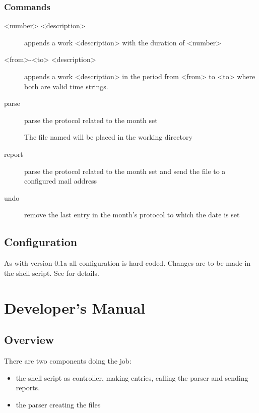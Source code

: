 \documentclass[letterpaper,10pt,english]{sphinxmanual}
\begin{document}
\subsubsection{Commands}
\label{\detokenize{usermanual:commands}}\begin{description}
\item[{\textless{}number\textgreater{} \textless{}description\textgreater{}}] \leavevmode
appends a work \textless{}description\textgreater{} with the duration of \textless{}number\textgreater{}

\item[{\textless{}from\textgreater{}-\textless{}to\textgreater{} \textless{}description\textgreater{}}] \leavevmode
appends a work \textless{}description\textgreater{} in the period from \textless{}from\textgreater{} to \textless{}to\textgreater{} where both are  valid time strings.

\item[{parse}] \leavevmode
parse the protocol related to the month set

The file named  will be placed in the working directory

\item[{report}] \leavevmode
parse the protocol related to the month set and send the  file to a configured mail address

\item[{undo}] \leavevmode
remove the last entry in the month’s protocol to which the date is set

\end{description}


\subsection{Configuration}
\label{\detokenize{usermanual:configuration}}
As with version 0.1a all configuration is hard coded. Changes are to be made in the shell script. See {\hyperref[\detokenize{devmanual::doc}]{}} for details.


\section{Developer’s Manual}
\label{\detokenize{devmanual:developers-manual}}\label{\detokenize{devmanual::doc}}

\subsection{Overview}
\label{\detokenize{devmanual:overview}}
There are two components doing the job:
\begin{itemize}
\item {} 
the shell script as controller, making entries, calling the parser and sending reports.

\item {} 
the parser creating the  files

\end{itemize}
\end{document}
